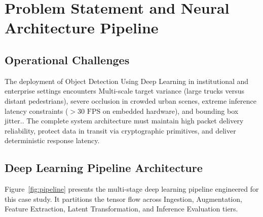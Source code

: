 \section{Problem Statement and Neural Architecture Pipeline}

\subsection{Operational Challenges}
The deployment of Object Detection Using Deep Learning in institutional and enterprise settings encounters Multi-scale target variance (large trucks versus distant pedestrians), severe occlusion in crowded urban scenes, extreme inference latency constraints ($>30\text{ FPS}$ on embedded hardware), and bounding box jitter.. The complete system architecture must maintain high packet delivery reliability, protect data in transit via cryptographic primitives, and deliver deterministic response latency.

\subsection{Deep Learning Pipeline Architecture}
Figure~\ref{fig:pipeline} presents the multi-stage deep learning pipeline engineered for this case study. It partitions the tensor flow across Ingestion, Augmentation, Feature Extraction, Latent Transformation, and Inference Evaluation tiers.

